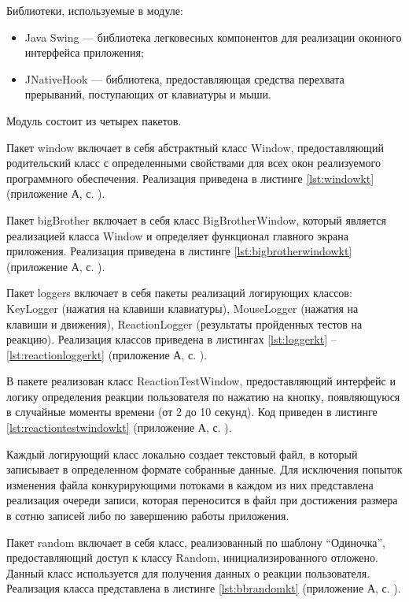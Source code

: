 Библиотеки, используемые в модуле:

\begin{itemize}[leftmargin=1.6\parindent]
	\item Java Swing \cite{swing} --- библиотека легковесных компонентов для реализации оконного интерфейса приложения;
	\item JNativeHook \cite{jnativehook} --- библиотека, предоставляющая средства перехвата прерываний, поступающих от клавиатуры и мыши.
\end{itemize}

Модуль состоит из четырех пакетов.

Пакет window включает в себя абстрактный класс Window, предоставляющий родительский класс с определенными свойствами для всех окон реализуемого программного обеспечения. Реализация приведена в листинге \ref{lst:windowkt} (приложение А, с. \pageref{chp:application-a}).

Пакет bigBrother включает в себя класс BigBrotherWindow, который является реализацией класса Window и определяет функционал главного экрана приложения. Реализация приведена в листинге \ref{lst:bigbrotherwindowkt} (приложение А, с. \pageref{chp:application-a}).

Пакет loggers включает в себя пакеты реализаций логирующих классов: Key\-Logger (нажатия на клавиши клавиатуры), MouseLogger (нажатия на клавиши и движения), ReactionLogger (результаты пройденных тестов на реакцию). Реализация классов приведена в листингах \ref{lst:loggerkt} -- \ref{lst:reactionloggerkt} (приложение А, с. \pageref{chp:application-a}).


В пакете реализован класс ReactionTestWindow, предоставляющий интерфейс и логику определения реакции пользователя по нажатию на кнопку, появляющуюся в случайные моменты времени (от 2 до 10 секунд). Код приведен в листинге \ref{lst:reactiontestwindowkt} (приложение А, с. \pageref{chp:application-a}).

Каждый логирующий класс локально создает текстовый файл, в который записывает в определенном формате собранные данные. Для исключения попыток изменения файла конкурирующими потоками в каждом из них представлена реализация очереди записи, которая переносится в файл при достижения размера в сотню записей либо по завершению работы приложения.

Пакет random включает в себя класс, реализованный по шаблону ``Одиночка'', предоставляющий доступ к классу Random, инициализированного отложено. Данный класс используется для получения данных о реакции пользователя. Реализация класса представлена в листинге \ref{lst:bbrandomkt} (приложение А, с. \pageref{chp:application-a}).

